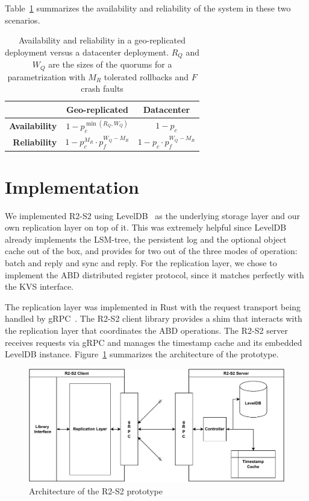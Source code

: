 Table~\ref{tab:parametrization} summarizes the availability and
reliability of the system in these two scenarios.

\begin{table}[ht]
    \centering
    \caption{Availability and reliability in a geo-replicated
    deployment versus a datacenter deployment. $R_Q$ and $W_Q$
    are the sizes of the quorums for a parametrization with $M_R$
    tolerated rollbacks and $F$ crash faults}\label{tab:parametrization}
    \begin{tabular}{|r||c|c|}
        \hline
        & \textbf{Geo-replicated} & \textbf{Datacenter} \\ \hline
        \textbf{Availability} & $1 - p_c^{\min(R_Q, W_Q)}$ & $1 - p_c$ \\ \hline
        \textbf{Reliability}  & $1 - p_c^{M_R} \cdot p_f^{W_Q - M_R}$ & $1 - p_c \cdot p_f^{W_Q - M_R}$ \\ \hline
    \end{tabular}\label{tab:parametrization}
\end{table}


\section{Implementation}\label{sec:r2s2implementation}

We implemented \ac{R2-S2} using LevelDB~\cite{leveldb} as the
underlying storage layer and our own replication layer on top of
it. This was extremely helpful since LevelDB already implements
the \ac{LSM-tree}, the persistent log and the optional object cache
out of the box, and provides for two out of the three modes of
operation: batch and reply and sync and reply. For the
replication layer, we chose to implement the \ac{ABD} distributed
register protocol, since it matches perfectly with the \ac{KVS}
interface.

The replication layer was implemented in Rust with the request transport
being handled by gRPC~\cite{grpc}. The \ac{R2-S2} client library
provides a shim that interacts with the replication layer that
coordinates the \ac{ABD} operations. The \ac{R2-S2} server
receives requests via gRPC and manages the timestamp cache and
its embedded LevelDB instance. Figure~\ref{fig:r2s2arch}
summarizes the architecture of the prototype.

\begin{figure}[ht]
    \centering
    \includegraphics[width=\linewidth]{img/r2s2_arch}
    \caption{Architecture of the \ac{R2-S2}
    prototype}\label{fig:r2s2arch}
\end{figure}

